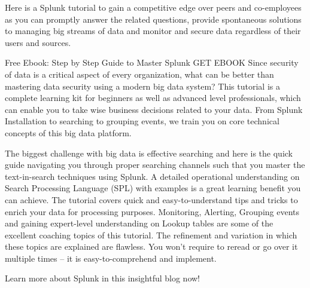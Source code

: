 Here is a Splunk tutorial to gain a competitive edge over peers and co-employees as you can promptly answer the related questions, provide spontaneous solutions to managing big streams of data and monitor and secure data regardless of their users and sources.

Free Ebook: Step by Step Guide to Master Splunk
GET EBOOK
Since security of data is a critical aspect of every organization, what can be better than mastering data security using a modern big data system? This tutorial is a complete learning kit for beginners as well as advanced level professionals, which can enable you to take wise business decisions related to your data. From Splunk Installation to searching to grouping events, we train you on core technical concepts of this big data platform.

The biggest challenge with big data is effective searching and here is the quick guide navigating you through proper searching channels such that you master the text-in-search techniques using Splunk.
A detailed operational understanding on Search Processing Language (SPL) with examples is a great learning benefit you can achieve.
The tutorial covers quick and easy-to-understand tips and tricks to enrich your data for processing purposes.
Monitoring, Alerting, Grouping events and gaining expert-level understanding on Lookup tables are some of the excellent coaching topics of this tutorial.
The refinement and variation in which these topics are explained are flawless. You won’t require to reread or go over it multiple times – it is easy-to-comprehend and implement.

Learn more about Splunk in this insightful blog now!
